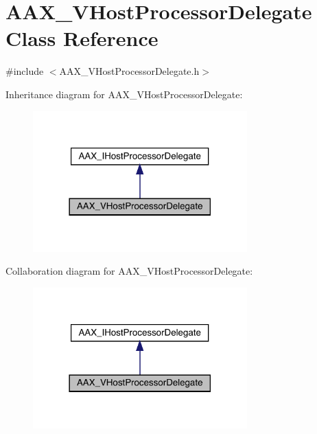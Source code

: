 \hypertarget{a01921}{}\section{A\+A\+X\+\_\+\+V\+Host\+Processor\+Delegate Class Reference}
\label{a01921}


{\ttfamily \#include $<$A\+A\+X\+\_\+\+V\+Host\+Processor\+Delegate.\+h$>$}



Inheritance diagram for A\+A\+X\+\_\+\+V\+Host\+Processor\+Delegate\+:
\nopagebreak
\begin{figure}[H]
\begin{center}
\leavevmode
\includegraphics[width=234pt]{a01920}
\end{center}
\end{figure}


Collaboration diagram for A\+A\+X\+\_\+\+V\+Host\+Processor\+Delegate\+:
\nopagebreak
\begin{figure}[H]
\begin{center}
\leavevmode
\includegraphics[width=234pt]{a01919}
\end{center}
\end{figure}


